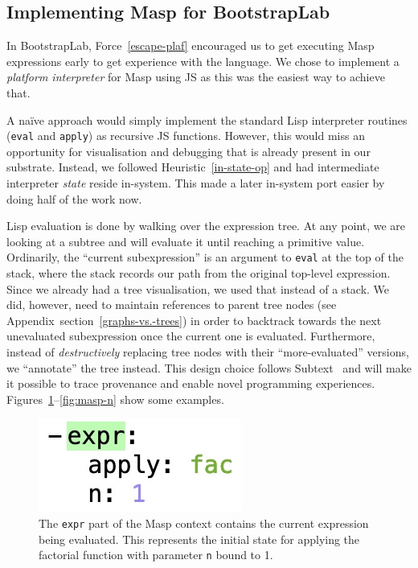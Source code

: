 \documentclass[ twoside,openright,titlepage,numbers=noenddot,headinclude,footinclude,cleardoublepage=empty,abstract=on,
                BCOR=5mm,paper=a4,fontsize=11pt
                ]{scrreprt}
\theoremstyle{definition}
\begin{document}
\hypertarget{implementing-masp-for-bootstraplab}{\subsection{Implementing Masp for
BootstrapLab}\label{implementing-masp-for-bootstraplab}}

In BootstrapLab, Force~\ref{escape-plaf} encouraged us to get executing
Masp expressions early to get experience with the language. We chose to
implement a \emph{platform interpreter} for Masp using \ac{JS} as this
was the easiest way to achieve that.

A naïve approach would simply implement the standard Lisp interpreter
routines (\texttt{eval} and \texttt{apply}) as recursive \ac{JS}
functions. However, this would miss an opportunity for visualisation and
debugging that is already present in our substrate. Instead, we followed
Heuristic~\ref{in-state-op} and had intermediate interpreter
\emph{state} reside in-system. This made a later in-system port easier
by doing half of the work now.

Lisp evaluation is done by walking over the expression tree. At any
point, we are looking at a subtree and will evaluate it until reaching a
primitive value. Ordinarily, the ``current subexpression'' is an
argument to \texttt{eval} at the top of the stack, where the stack
records our path from the original top-level expression. Since we
already had a tree visualisation, we used that instead of a stack. We
did, however, need to maintain references to parent tree nodes (see
Appendix~section~\ref{graphs-vs.-trees}) in order to backtrack towards
the next unevaluated subexpression once the current one is evaluated.
Furthermore, instead of \emph{destructively} replacing tree nodes with
their ``more-evaluated'' versions, we ``annotate'' the tree instead.
This design choice follows Subtext~\parencite{Subtext} and will make it
possible to trace provenance and enable novel programming experiences.
Figures~\ref{fig:masp-1}--\ref{fig:masp-n} show some examples.

\begin{figure}
\centering
\includegraphics{masp/1-apply-fac.png}
\caption[Masp Factorial evaluation step 1]{The \texttt{expr} part of the Masp context contains the current expression being evaluated. This represents the initial state for applying the factorial function with parameter \texttt{n} bound to 1.}
\label{fig:masp-1}
\end{figure}
\end{document}
